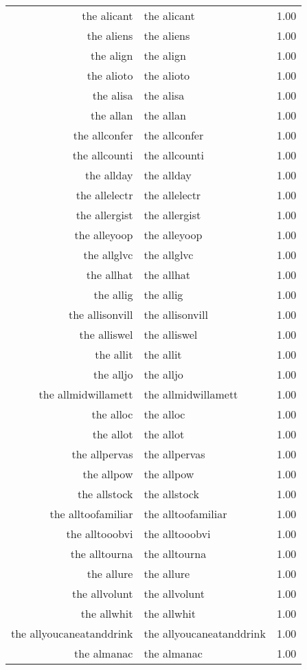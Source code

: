 \begin{table}[ht]
\begin{tabular}{rlr}
  the alicant & the alicant & 1.00 \\ 
  the aliens & the aliens & 1.00 \\ 
  the align & the align & 1.00 \\ 
  the alioto & the alioto & 1.00 \\ 
  the alisa & the alisa & 1.00 \\ 
  the allan & the allan & 1.00 \\ 
  the allconfer & the allconfer & 1.00 \\ 
  the allcounti & the allcounti & 1.00 \\ 
  the allday & the allday & 1.00 \\ 
  the allelectr & the allelectr & 1.00 \\ 
  the allergist & the allergist & 1.00 \\ 
  the alleyoop & the alleyoop & 1.00 \\ 
  the allglvc & the allglvc & 1.00 \\ 
  the allhat & the allhat & 1.00 \\ 
  the allig & the allig & 1.00 \\ 
  the allisonvill & the allisonvill & 1.00 \\ 
  the alliswel & the alliswel & 1.00 \\ 
  the allit & the allit & 1.00 \\ 
  the alljo & the alljo & 1.00 \\ 
  the allmidwillamett & the allmidwillamett & 1.00 \\ 
  the alloc & the alloc & 1.00 \\ 
  the allot & the allot & 1.00 \\ 
  the allpervas & the allpervas & 1.00 \\ 
  the allpow & the allpow & 1.00 \\ 
  the allstock & the allstock & 1.00 \\ 
  the alltoofamiliar & the alltoofamiliar & 1.00 \\ 
  the alltooobvi & the alltooobvi & 1.00 \\ 
  the alltourna & the alltourna & 1.00 \\ 
  the allure & the allure & 1.00 \\ 
  the allvolunt & the allvolunt & 1.00 \\ 
  the allwhit & the allwhit & 1.00 \\ 
  the allyoucaneatanddrink & the allyoucaneatanddrink & 1.00 \\ 
  the almanac & the almanac & 1.00 \\ 

\end{tabular}
\end{table}
